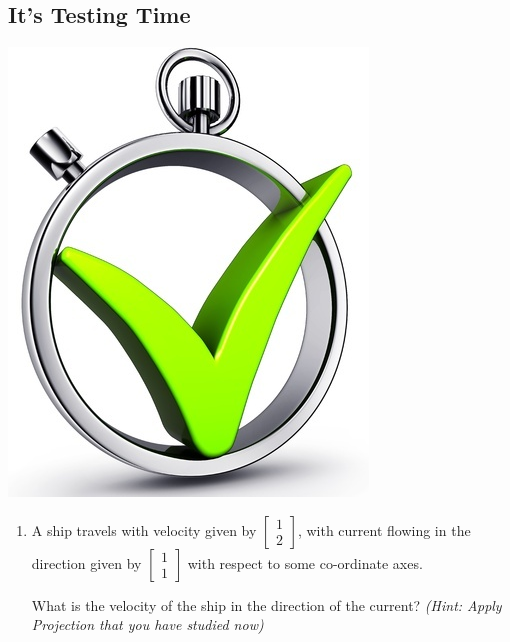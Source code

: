 \documentclass[a4paper,12pt]{article}
\begin{document}
\begin{flushleft}
\begin{flushleft}
\begin{minipage}[b]{0.4\linewidth}
\section*{It's Testing Time}
\newline
\end{minipage}
\hfill
\begin{minipage}[b]{0.6\linewidth}
\includegraphics[height=3\baselineskip]{testing_time.jpg}
\end{minipage}
\begin{flushleft}
\begin{enumerate}
    \item A ship travels with velocity given by $
\begin{bmatrix}
1\\
2
\end{bmatrix}
$, with current flowing in the direction given by $
\begin{bmatrix}
1\\
1
\end{bmatrix}
$ with respect to some co-ordinate axes.
\newline

What is the velocity of the ship in the direction of the current?
\newline
\textit{(Hint: Apply Projection that you have studied now)}


\end{enumerate}
\end{flushleft}
\end{flushleft}
\end{flushleft}
\end{document}
